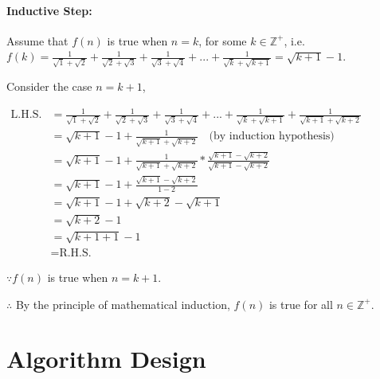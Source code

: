 \documentclass{article}
\begin{document}
\begin{enumerate}[label=(\alph*)]
\paragraph*{Inductive Step:\\}
Assume that $f(n)$ is true when $n = k$, for some $k \in \mathbb{Z}^+$, i.e. $f(k) = \frac{1}{\sqrt{1}+\sqrt{2}} + \frac{1}{\sqrt{2}+\sqrt{3}} + \frac{1}{\sqrt{3}+\sqrt{4}} + ... + \frac{1}{\sqrt{k}+\sqrt{k+1}} = \sqrt{k+1}-1$.

Consider the case $n=k+1$,

$\begin{aligned}
\text{L.H.S.} &= \frac{1}{\sqrt{1}+\sqrt{2}} + \frac{1}{\sqrt{2}+\sqrt{3}} + \frac{1}{\sqrt{3}+\sqrt{4}} + ... + \frac{1}{\sqrt{k}+\sqrt{k+1}} + \frac{1}{\sqrt{k+1}+\sqrt{k+2}} \\
&= \sqrt{k+1}-1 + \frac{1}{\sqrt{k+1}+\sqrt{k+2}} \quad \text{(by induction hypothesis)} \\
&= \sqrt{k+1}-1 + \frac{1}{\sqrt{k+1}+\sqrt{k+2}} * \frac{\sqrt{k+1}-\sqrt{k+2}}{\sqrt{k+1}-\sqrt{k+2}} \\
&= \sqrt{k+1}-1 + \frac{\sqrt{k+1}-\sqrt{k+2}}{1-2} \\
&= \sqrt{k+1}-1 + \sqrt{k+2} - \sqrt{k+1} \\
&= \sqrt{k+2} - 1 \\
&= \sqrt{k+1+1} - 1 \\
&= \text{R.H.S.}
\end{aligned}$

$\because f(n)$ is true when $n = k+1$.

$\therefore$ By the principle of mathematical induction,
$f(n)$ is true for all $n \in \mathbb{Z}^+$.

\end{enumerate}

\section{Algorithm Design}
\end{document}
